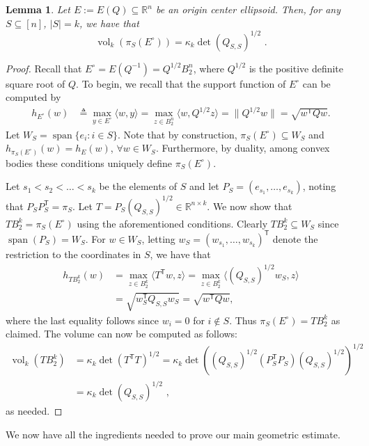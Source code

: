 \documentclass[11pt]{article}
\newtheorem{lemma}[theorem]{Lemma}
\newcommand{\R}{{\mathbb{R}}}
\newcommand{\T}{\mathsf T}
\newcommand{\eqdef}{\triangleq}
\newcommand{\inner}[2]{\langle #1, #2 \rangle}
\DeclareMathOperator{\vol}{vol}
\DeclareMathOperator{\lspan}{span}
\begin{document}
\begin{lemma}\label{lem:ellipsoid-volumes}
Let $E := E(Q) \subseteq \R^n$ be an origin center ellipsoid. Then, for any
$S \subseteq [n]$, $|S| = k$, we have that 
\[
\vol_k(\pi_S(E^\circ)) = \kappa_k \det(Q_{S,S})^{1/2} \text{ .}
\]
\end{lemma}
\begin{proof}
Recall that $E^\circ = E(Q^{-1}) = Q^{1/2} B_2^n$, where $Q^{1/2}$ is the
positive definite square root of $Q$. To begin, we recall that the support
function of $E^\circ$ can be computed by
\begin{align*}
h_{E^\circ}(w) &\eqdef \max_{y \in E^\circ} \inner{w}{y} 
               = \max_{z \in B_2^n} \inner{w}{Q^{1/2} z} 
               = \|Q^{1/2} w\| = \sqrt{w^\T Q w}.
\end{align*}
Let $W_S = \lspan\{e_i: i \in S\}$. Note that by construction, $\pi_S(E^\circ)
\subseteq W_S$ and $h_{\pi_S(E^\circ)}(w) = h_{E}(w)$, $\forall w \in W_S$.
Furthermore, by duality, among convex bodies these conditions uniquely define $\pi_S(E^\circ)$. 

Let $s_1 < s_2 < \dots < s_k$ be the elements of $S$ and let $P_S =
(e_{s_1},\dots,e_{s_k})$, noting that $P_S P_S^\T = \pi_S$. Let $T = P_S
(Q_{S,S})^{1/2} \in \R^{n \times k}$. We now show that $TB_2^k = \pi_S(E^\circ)$
using the aforementioned conditions. Clearly $TB_2^k \subseteq W_S$ since
$\lspan(P_S) = W_S$. For $w \in W_S$, letting $w_S = (w_{s_1},\dots,w_{s_k})^\T$
denote the restriction to the coordinates in $S$, we have that 
\begin{align*}
h_{TB_2^k}(w) &= \max_{z \in B_2^k} \inner{T^\T w}{z} 
              = \max_{z \in B_2^k} \inner{(Q_{S,S})^{1/2} w_S}{z} \\ 
              &= \sqrt{w_S^\T Q_{S,S} w_S} = \sqrt{w^\T Q w} ,
\end{align*} 
where the last equality follows since $w_i = 0$ for $i \notin S$. Thus
$\pi_S(E^\circ) = TB_2^k$ as claimed. The volume can now be computed as follows:
\begin{align*}
\vol_k(TB_2^k) &= \kappa_k \det(T^\T T)^{1/2} 
               = \kappa_k \det((Q_{S,S})^{1/2} (P_S^\T P_S)
(Q_{S,S})^{1/2})^{1/2} \\
               &= \kappa_k \det(Q_{S,S})^{1/2} \text{ ,}
\end{align*}
as needed.
\end{proof}


We now have all the ingredients needed to prove our main geometric estimate.
\end{document}
